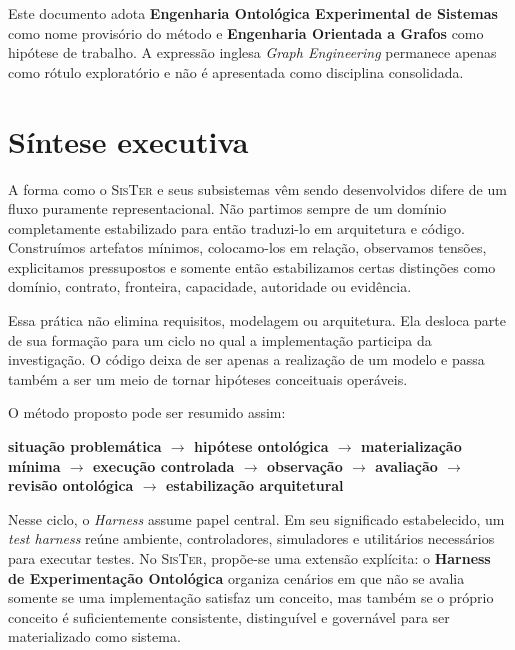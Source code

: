 \documentclass[11pt,a4paper,oneside]{article}
\newcommand{\termo}[1]{\textbf{#1}}
\newcommand{\sister}{\textsc{SisTer}}
\newcommand{\harness}{\textit{Harness}}
\begin{document}
\begin{decisao}
Este documento adota \textbf{Engenharia Ontológica Experimental de Sistemas} como nome provisório do método e \textbf{Engenharia Orientada a Grafos} como hipótese de trabalho. A expressão inglesa \textit{Graph Engineering} permanece apenas como rótulo exploratório e não é apresentada como disciplina consolidada.
\end{decisao}

\tableofcontents
\clearpage
{}

\section{Síntese executiva}

A forma como o \sister{} e seus subsistemas vêm sendo desenvolvidos difere de um fluxo puramente representacional. Não partimos sempre de um domínio completamente estabilizado para então traduzi-lo em arquitetura e código. Construímos artefatos mínimos, colocamo-los em relação, observamos tensões, explicitamos pressupostos e somente então estabilizamos certas distinções como domínio, contrato, fronteira, capacidade, autoridade ou evidência.

Essa prática não elimina requisitos, modelagem ou arquitetura. Ela desloca parte de sua formação para um ciclo no qual a implementação participa da investigação. O código deixa de ser apenas a realização de um modelo e passa também a ser um meio de tornar hipóteses conceituais operáveis.

O método proposto pode ser resumido assim:

\begin{principio}
\centering
\textbf{situação problemática $\rightarrow$ hipótese ontológica $\rightarrow$ materialização mínima $\rightarrow$ execução controlada $\rightarrow$ observação $\rightarrow$ avaliação $\rightarrow$ revisão ontológica $\rightarrow$ estabilização arquitetural}
\end{principio}

Nesse ciclo, o \harness{} assume papel central. Em seu significado estabelecido, um \textit{test harness} reúne ambiente, controladores, simuladores e utilitários necessários para executar testes. No \sister{}, propõe-se uma extensão explícita: o \termo{Harness de Experimentação Ontológica} organiza cenários em que não se avalia somente se uma implementação satisfaz um conceito, mas também se o próprio conceito é suficientemente consistente, distinguível e governável para ser materializado como sistema.
\end{document}
